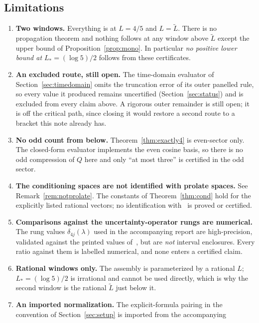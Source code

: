\documentclass[11pt,a4paper]{article}
\theoremstyle{definition}
\theoremstyle{remark}
\begin{document}
\subsection{Limitations}

\begin{enumerate}
\item \textbf{Two windows.} Everything is at $L = 4/5$ and $L = \widetilde L$.
  There is no propagation theorem and nothing follows at any window above
  $\widetilde L$ except the upper bound of Proposition~\ref{prop:mono}. In
  particular \emph{no positive lower bound at $L_\ast = (\log 5)/2$} follows
  from these certificates.
\item \textbf{An excluded route, still open.} The time-domain evaluator of
  Section~\ref{sec:timedomain} omits the truncation error of its outer panelled
  rule, so every value it produced remains uncertified
  (Section~\ref{sec:status}) and is excluded from every claim above. A rigorous
  outer remainder is still open; it is off the critical path, since closing it
  would restore a second route to a bracket this note already has.
\item \textbf{No odd count from below.} Theorem~\ref{thm:exactly4} is
  even-sector only. The closed-form evaluator implements the even cosine basis,
  so there is no odd compression of $Q$ here and only ``at most three'' is
  certified in the odd sector.
\item \textbf{The conditioning spaces are not identified with prolate spaces.}
  See Remark~\ref{rem:notprolate}. The constants of Theorem~\ref{thm:cond} hold
  for the explicitly listed rational vectors; no identification
  with~\cite[\S5.1--5.3]{ACLG} is proved or certified.
\item \textbf{Comparisons against the uncertainty-operator rungs are
  numerical.} The rung values $\delta_{4j}(\lambda)$ used in the accompanying
  report are high-precision, validated against the printed values
  of~\cite{ACLG}, but are \emph{not} interval enclosures. Every ratio against
  them is labelled numerical, and none enters a certified claim.
\item \textbf{Rational windows only.} The assembly is parameterized by a
  rational $L$; $L_\ast = (\log 5)/2$ is irrational and cannot be used
  directly, which is why the second window is the rational $\widetilde L$ just
  below it.
\item \textbf{An imported normalization.} The explicit-formula pairing in the
  convention of Section~\ref{sec:setup} is imported from the accompanying

\end{enumerate}
\end{document}
